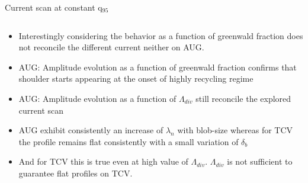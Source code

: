 \documentclass[10pt, compress]{beamer}
\begin{document}
\begin{frame}{Current scan at constant q$_{95}$}
\begin{columns}
\begin{column}{0.3\textwidth}
\begin{itemize}
{          detachment even if high density is
          achieved. Consistent with lower 
            volumetric recombination from DSS}
         \item<only@5> Interestingly considering the behavior as a
           function of greenwald fraction does not reconcile the
           different current neither on AUG.  
        \item<only@8> AUG: Amplitude evolution as a function of
          greenwald fraction confirms that shoulder starts appearing
          at the onset of highly recycling regime 
        \item<only@9> AUG: Amplitude evolution as a function of $\Lambda_{div}$ 
          still reconcile the explored current scan
        \item<only@10> AUG exhibit consistently an increase of
          $\lambda_n$ with blob-size whereas for TCV the profile
          remains flat consistently with a small variation of
          $\delta_b$
        \item<only@11> And for TCV this is true even at high value of
          $\Lambda_{div}$. \alert{$\Lambda_{div}$ is not sufficient to
          guarantee flat profiles on TCV.}
      \end{itemize}
    \end{column}
  \end{columns}
\end{frame}
\end{document}
